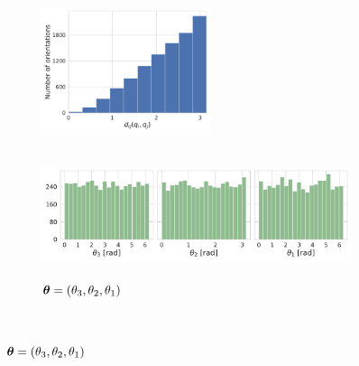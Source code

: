 \clearpage

\section{}\label{apx:uniform-sampling}




\begin{figure}[ht!]
    \centering
    \begin{subfigure}[b]{0.26\linewidth}
        \centering
        \includegraphics[height=10em]{figures/dQ_5j0n_uniform_angles}
        \caption{}%
    \end{subfigure}
    \hfill
    \begin{subfigure}[b]{0.66\linewidth}
        \centering
        \includegraphics[height=10em]{figures/uniform_angles_ang}
        \caption{${\boldsymbol{\theta}} = (\theta_3,\theta_2,\theta_1)$}%
    \end{subfigure}
    
    \\ \vspace{1em}
    

\end{figure}
